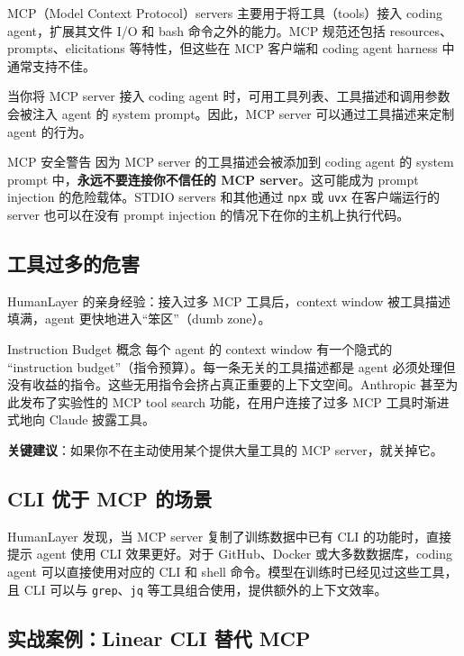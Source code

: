 \documentclass[a4paper]{article}
\begin{document}
MCP（Model Context Protocol）servers 主要用于将工具（tools）接入 coding agent，扩展其文件 I/O 和 bash 命令之外的能力。MCP 规范还包括 resources、prompts、elicitations 等特性，但这些在 MCP 客户端和 coding agent harness 中通常支持不佳。

当你将 MCP server 接入 coding agent 时，可用工具列表、工具描述和调用参数会被注入 agent 的 system prompt。因此，MCP server 可以通过工具描述来定制 agent 的行为。

\begin{warningbox}{MCP 安全警告}
因为 MCP server 的工具描述会被添加到 coding agent 的 system prompt 中，\textbf{永远不要连接你不信任的 MCP server}。这可能成为 prompt injection 的危险载体。STDIO servers 和其他通过 \texttt{npx} 或 \texttt{uvx} 在客户端运行的 server 也可以在没有 prompt injection 的情况下在你的主机上执行代码。
\end{warningbox}

\subsection{工具过多的危害}

HumanLayer 的亲身经验：接入过多 MCP 工具后，context window 被工具描述填满，agent 更快地进入``笨区''（dumb zone）。

\begin{knowledgebox}{Instruction Budget 概念}
每个 agent 的 context window 有一个隐式的 ``instruction budget''（指令预算）。每一条无关的工具描述都是 agent 必须处理但没有收益的指令。这些无用指令会挤占真正重要的上下文空间。Anthropic 甚至为此发布了实验性的 MCP tool search 功能，在用户连接了过多 MCP 工具时渐进式地向 Claude 披露工具。
\end{knowledgebox}

\textbf{关键建议}：如果你不在主动使用某个提供大量工具的 MCP server，就关掉它。

\subsection{CLI 优于 MCP 的场景}

HumanLayer 发现，当 MCP server 复制了训练数据中已有 CLI 的功能时，直接提示 agent 使用 CLI 效果更好。对于 GitHub、Docker 或大多数数据库，coding agent 可以直接使用对应的 CLI 和 shell 命令。模型在训练时已经见过这些工具，且 CLI 可以与 \texttt{grep}、\texttt{jq} 等工具组合使用，提供额外的上下文效率。

\subsection{实战案例：Linear CLI 替代 MCP}
\end{document}
